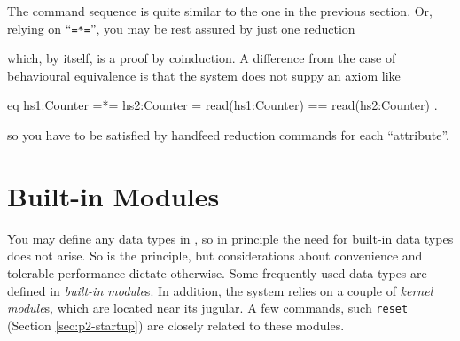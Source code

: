 \documentclass[a4paper]{memoir}
\begin{document}
The command sequence is quite similar to the one in the previous section.
Or, relying on ``\verb|=*=|'', you may be rest assured by just one
reduction
\begin{vvtm}
\begin{ccode}
\end{ccode}
\end{vvtm}
which, by itself, is a proof by coinduction. A difference from the case of
behavioural equivalence is that the system does not suppy an
axiom like
\begin{vvtm}
\begin{ccode}
  eq hs1:Counter =*= hs2:Counter = read(hs1:Counter) == read(hs2:Counter) .
\end{ccode}
\end{vvtm}
so you have to be satisfied by handfeed reduction commands for each
``attribute''.

%

\chapter{Built-in Modules}\label{sec:p2-builtin-module}

You may define any data types in \cafeobj, so in principle the need for
built-in data types does not arise. So is the principle, but
considerations about
convenience and tolerable performance dictate otherwise. Some
frequently used data types are defined in {\em built-in module}s.
 In addition,
the system relies on a couple of {\em kernel module}s,
which are located near its jugular.
A few commands, such \verb|reset| (Section \ref{sec:p2-startup}) are
closely related to these modules.
\end{document}
